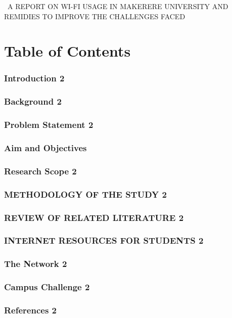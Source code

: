 ﻿\documentclass[10]{article}
\begin{document}
\begin{title}
\huge{\ A REPORT ON WI-FI USAGE IN MAKERERE UNIVERSITY AND REMIDIES TO IMPROVE THE CHALLENGES FACED }
\end{title}
\author{BAMUZIBIRE SOLOMON MUKISA,14/U/3938/PS,214015782}
\section{Table of Contents}
 \subsubsection{Introduction	2}
 \subsubsection{ Background	2}
 \subsubsection{Problem Statement	2}
 \subsubsection{Aim and Objectives}
 \subsubsection{Research Scope	2}
 \subsubsection{METHODOLOGY OF THE STUDY	2}
 \subsubsection{REVIEW OF RELATED LITERATURE	2}
 \subsubsection{INTERNET RESOURCES FOR STUDENTS	2}
 \subsubsection{The Network	2}
 \subsubsection{Campus Challenge	2}
 \subsubsection{References	2}
 
\end{document}
